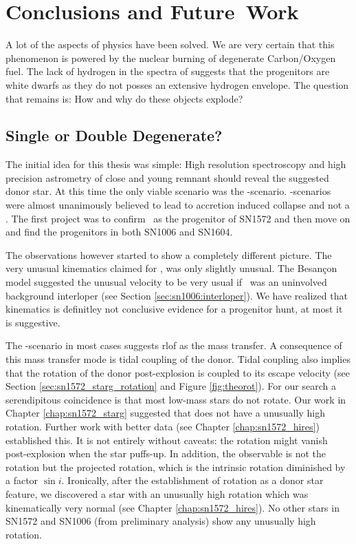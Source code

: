 \chapter{Conclusions and Future~Work}
\label{chap:four}

A lot of the aspects of \snia physics have been solved. We are very certain that this phenomenon is powered by the nuclear burning of degenerate Carbon/Oxygen fuel. The lack of hydrogen in the spectra of \sneia suggests that the progenitors are white dwarfs as they do not posses an extensive hydrogen envelope. The question that remains is: How and why do these objects explode?

\section{Single or Double Degenerate?}

The initial idea for this thesis was simple: High resolution spectroscopy and high precision astrometry of close and young remnant should reveal the suggested donor star. At this time the only viable scenario was the \sd-scenario. \dd-scenarios were almost unanimously believed to lead to accretion induced collapse and not a \snia. The first project was to confirm \starg\ as the progenitor of SN1572 and then move on and find the progenitors in both SN1006 and SN1604. 

The observations however started to show a completely different picture. The very unusual kinematics claimed for \starg \citep{2004Natur.431.1069R}, was only slightly unusual. The Besan\c{c}on model suggested the unusual velocity to be very usual if \starg\ was an uninvolved background interloper (see Section \ref{sec:sn1006:interloper}). We have realized that kinematics is definitley not conclusive evidence for a progenitor hunt, at most it is suggestive. 

The \sd-scenario in most cases suggests \gls{rlof} as the mass transfer. A consequence of this mass transfer mode is tidal coupling of the donor. Tidal coupling also implies that the rotation of the donor post-explosion is coupled to its escape velocity (see Section \ref{sec:sn1572_starg_rotation} and Figure \ref{fig:theorot}). For our search a serendipitous coincidence is that most low-mass stars do not rotate. Our work in Chapter \ref{chap:sn1572_starg} suggested that \starg does not have a unusually high rotation. Further work with better data (see Chapter \ref{chap:sn1572_hires}) established this. It is not entirely without caveats: the rotation might vanish post-explosion when the star puffs-up. In addition, the observable is not the rotation but the projected rotation, which is the intrinsic rotation diminished by a factor $\sin{i}$. Ironically, after the establishment of rotation as a donor star feature, we discovered a star with an unusually high rotation which was kinematically very normal (see Chapter \ref{chap:sn1572_hires}). No other stars in SN1572 and SN1006 (from preliminary analysis) show any unusually high rotation. 

